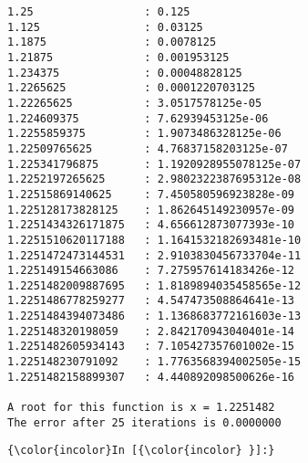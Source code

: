 \documentclass[11pt]{article}
\begin{document}
    \begin{Verbatim}[commandchars=\\\{\}]
1.25                 : 0.125               
1.125                : 0.03125             
1.1875               : 0.0078125           
1.21875              : 0.001953125         
1.234375             : 0.00048828125       
1.2265625            : 0.0001220703125     
1.22265625           : 3.0517578125e-05    
1.224609375          : 7.62939453125e-06   
1.2255859375         : 1.9073486328125e-06 
1.22509765625        : 4.76837158203125e-07
1.225341796875       : 1.1920928955078125e-07
1.2252197265625      : 2.9802322387695312e-08
1.22515869140625     : 7.450580596923828e-09
1.225128173828125    : 1.862645149230957e-09
1.2251434326171875   : 4.656612873077393e-10
1.2251510620117188   : 1.1641532182693481e-10
1.2251472473144531   : 2.9103830456733704e-11
1.225149154663086    : 7.275957614183426e-12
1.2251482009887695   : 1.8189894035458565e-12
1.2251486778259277   : 4.547473508864641e-13
1.2251484394073486   : 1.1368683772161603e-13
1.225148320198059    : 2.842170943040401e-14
1.2251482605934143   : 7.105427357601002e-15
1.225148230791092    : 1.7763568394002505e-15
1.2251482158899307   : 4.440892098500626e-16

A root for this function is x = 1.2251482
The error after 25 iterations is 0.0000000

    \end{Verbatim}

    \begin{Verbatim}[commandchars=\\\{\}]
{\color{incolor}In [{\color{incolor} }]:} 
\end{Verbatim}


    
    
    
    
\end{document}
